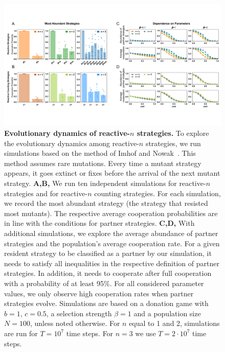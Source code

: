 \documentclass[11pt]{article}
\begin{document}
\begin{figure}[t]
  \centering
  \includegraphics[width=\textwidth]{figures/abundant_strategies.pdf}
  \caption{\textbf{Evolutionary dynamics of reactive-$n$ strategies.}
  To explore the evolutionary dynamics among reactive-$n$ strategies, we run simulations based on the
  method of Imhof and Nowak~\cite{imhof:royal:2010}. 
  This method assumes rare mutations. 
  Every time a mutant strategy appears, it goes extinct or fixes before the arrival of the next mutant strategy. 
  {\bf A,B,} We run ten independent simulations for reactive-$n$ strategies and for reactive-$n$ counting strategies. 
  For each simulation, we record the most abundant strategy (the strategy that resisted most mutants). 
  The respective average cooperation probabilities are in line with the conditions for partner strategies. 
  {\bf C,D,} With additional simulations, we explore the average abundance of partner strategies and the population's average cooperation rate. 
For a given resident strategy to be classified as a partner by our simulation, it needs to satisfy all inequalities in the respective definition of partner strategies. 
In addition, it needs to cooperate after full cooperation with a probability of at least 95\%.  
For all considered parameter values, we only observe high cooperation rates when partner strategies evolve. 
Simulations are based on a donation game with \(b\!=\!1\),  \(c\!=\!0.5\), a selection strength $\beta\!=\!1$
and a population size $N\!=\!100$, unless noted otherwise. For $n$ equal to 1 and 2, simulations are run for \(T\!=\! 10 ^ 7\) time steps. For $n\!=\!3$ we use \(T\!=\! 2 \!\cdot\!10 ^ 7\) time steps.
}\label{fig:evolutionary_results}
\end{figure}
\end{document}
